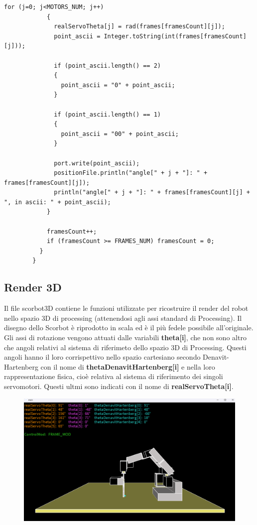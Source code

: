 \documentclass[a4paper]{article}
\begin{document}
\begin{lstlisting}[style=myprocessingstyle, caption=Funzioni per la comunicazione degli angoli]
            for (j=0; j<MOTORS_NUM; j++) 
            {
              realServoTheta[j] = rad(frames[framesCount][j]);
              point_ascii = Integer.toString(int(frames[framesCount][j]));
        
              if (point_ascii.length() == 2)
              {
                point_ascii = "0" + point_ascii;
              }
        
              if (point_ascii.length() == 1)
              {
                point_ascii = "00" + point_ascii;
              }
        
              port.write(point_ascii);
              positionFile.println("angle[" + j + "]: " + frames[framesCount][j]);
              println("angle[" + j + "]: " + frames[framesCount][j] + ", in ascii: " + point_ascii);
            }
        
            framesCount++;
            if (framesCount >= FRAMES_NUM) framesCount = 0;
          }
        }
    \end{lstlisting}
    
    \newpage
    
    \subsection{Render 3D}
    
    \begin{text}
        Il file scorbot3D contiene le funzioni utilizzate per ricostruire il render del robot nello spazio 3D di processing (attenendosi agli assi standard di Processing). Il disegno dello Scorbot è riprodotto in scala ed è il più fedele possibile all'originale. Gli assi di rotazione vengono attuati dalle variabili \textbf{theta[i]}, che non sono altro che angoli relativi al sistema di riferimeto dello spazio 3D di Processing. Questi angoli hanno il loro corrispettivo nello spazio cartesiano secondo Denavit-Hartenberg con il nome di \textbf{thetaDenavitHartenberg[i]} e nella loro rappresentazione fisica, cioè relativa al sistema di riferimento dei singoli servomotori. Questi ultmi sono indicati con il nome di \textbf{realServoTheta[i]}.
    \end{text}
    
    \begin{figure}
        \centering
        \includegraphics[width=15cm]{images/render3D.png}
    \end{figure}
    
\end{document}
